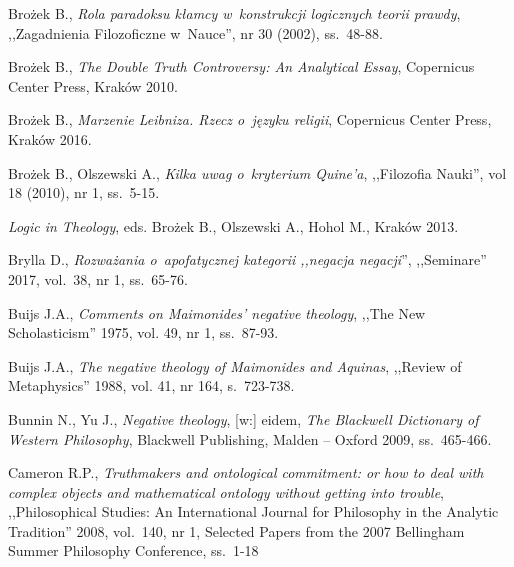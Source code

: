 \begin{thebibliography}{100}

Brożek B., \textit{Rola paradoksu kłamcy w~konstrukcji logicznych teorii prawdy}, ,,Zagadnienia Filozoficzne w~Nauce'', nr 30 (2002), ss.~48-88.

Brożek B., \textit{The Double Truth Controversy: An Analytical Essay}, Copernicus Center Press, Kraków 2010.

Brożek B., \textit{Marzenie Leibniza. Rzecz o~języku religii}, Copernicus Center Press, Kraków 2016.

Brożek B., Olszewski A., \textit{Kilka uwag o~kryterium Quine'a}, ,,Filozofia Nauki'', vol 18 (2010), nr 1, ss.~5-15.

\textit{Logic in Theology}, eds. Brożek B., Olszewski A., Hohol M., Kraków 2013.

Brylla D., \textit{Rozważania o~apofatycznej kategorii ,,negacja negacji}'', ,,Seminare'' 2017, vol.~38, nr 1, ss.~65-76.


Buijs J.A., \textit{Comments on Maimonides' negative theology}, ,,The New Scholasticism'' 1975, vol. 49, nr 1, ss.~87-93.

Buijs J.A., \textit{The negative theology of Maimonides and Aquinas}, ,,Review of Metaphysics'' 1988, vol. 41, nr 164, s.~723-738.


Bunnin N., Yu J., \textit{Negative theology}, [w:] eidem, \textit{The Blackwell Dictionary of Western Philosophy}, Blackwell Publishing, Malden -- Oxford 2009, ss.~465-466.


Cameron R.P., \textit{Truthmakers and ontological commitment: or how to deal with complex objects and mathematical ontology without getting into trouble},
,,Philosophical Studies: An International Journal for Philosophy in the Analytic Tradition'' 2008, vol.~140, nr 1, Selected Papers from the 2007 Bellingham Summer Philosophy Conference, ss.~1-18


\end{thebibliography}
